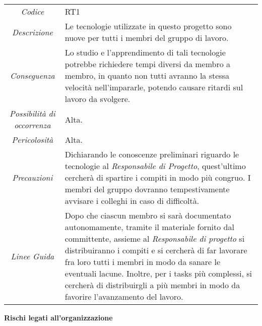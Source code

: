 \def\tabularxcolumn#1{m{#1}}
{
	
	\begin{center}
		\renewcommand{\arraystretch}{1.4}
		\begin{tabularx}{\textwidth}{|c|X|}
			\hline
			\rowcolor{airforceblue}
			\multicolumn{2}{|c|}{\textit{Inesperienza tecnologica}}\\
			\hline
			\textit{Codice} & RT1 \\
			\hline
			\textit{Descrizione} & Le tecnologie utilizzate in questo progetto sono nuove per tutti i membri del gruppo di lavoro. \\
			\hline
			\textit{Conseguenza} & Lo studio e l'apprendimento di tali tecnologie potrebbe richiedere tempi diversi da membro a membro, in quanto non tutti avranno la stessa velocità nell'impararle, potendo causare ritardi sul lavoro da svolgere. \\
			\hline
			\textit{Possibilità di occorrenza} & Alta. \\
			\hline
			\textit{Pericolosità} & Alta. \\
			\hline
			\textit{Precauzioni} & Dichiarando le conoscenze preliminari riguardo le tecnologie al \textit{Responsabile di Progetto}, quest'ultimo cercherà di spartire i compiti in modo più congruo.
			I membri del gruppo dovranno tempestivamente avvisare i colleghi in caso di difficoltà.  \\
			\hline
			\textit{Linee Guida} & Dopo che ciascun membro si sarà documentato autonomamente, tramite il materiale fornito dal committente, assieme al \textit{Responsabile di progetto} si distribuiranno i compiti e si cercherà di far lavorare fra loro tutti i membri in modo da sanare le eventuali lacune.
			Inoltre, per i tasks più complessi, si cercherà di distribuirgli a più membri in modo da favorire l'avanzamento del lavoro.  \\
			\hline
		\end{tabularx}
	\end{center}

\quad
\begin{center}
	\LARGE\textbf{Rischi legati all'organizzazione}
\end{center}

\def\tabularxcolumn#1{m{#1}}
{
	
}}
